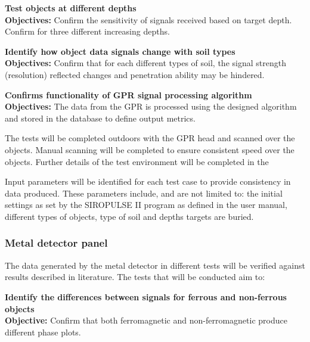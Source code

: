 \documentclass[main.tex]{subfiles}
\begin{document}
\begin{appendices}
\begin{gpr}
\textbf{Test objects at different depths}\\
\textbf{Objectives:} Confirm the sensitivity of signals received based on target depth. Confirm for three different increasing depths.
\end{gpr}
\begin{gpr}
\textbf{Identify how object data signals change with soil types}\\
\textbf{Objectives:} Confirm that for each different types of soil, the signal strength (resolution) reflected changes and penetration ability may be hindered. 
\end{gpr}

\begin{gpr}
\textbf{Confirms functionality of GPR signal processing algorithm}\\
\textbf{Objectives:} The data from the GPR is processed using the designed algorithm and stored in the database to define output metrics. 
\end{gpr}


\medskip\noindent
The tests will be completed outdoors with the GPR head and scanned over the objects. Manual scanning will be completed to ensure consistent speed over the objects. Further details of the test environment will be completed in the 

\medskip\noindent
Input parameters will be identified for each test case to provide consistency in data produced. These parameters include, and are not limited to: the initial settings as set by the SIROPULSE II program as defined in the user manual, different types of objects, type of soil and depths targets are buried.

\subsubsection{Metal detector panel}
The data generated by the metal detector in different tests will be verified against results described in literature. The tests that will be conducted aim to:
\begin{mds}
\textbf{Identify the differences between signals for ferrous and non-ferrous objects}\\
\textbf{Objective:} Confirm that both ferromagnetic and non-ferromagnetic produce different phase plots.


\end{mds}
\end{appendices}
\end{document}
